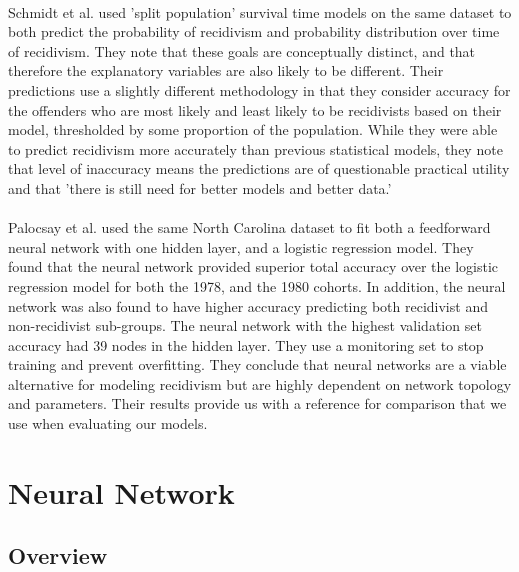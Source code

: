 \documentclass[a4paper]{article}
\theoremstyle{plain}
\begin{document}
\paragraph{}
Schmidt et al. \cite{schmidt1989predicting} used 'split population' survival time models on the same dataset to both predict the probability of recidivism and probability distribution over time of recidivism. They note that these goals are conceptually distinct, and that therefore the explanatory variables are also likely to be different. Their predictions use a slightly different methodology in that they consider accuracy for the offenders who are most likely and least likely to be recidivists based on their model, thresholded by some proportion of the population. While they were able to predict recidivism more accurately than previous statistical models, they note that level of inaccuracy means the predictions are of questionable practical utility and that 'there is still need for better models and better data.'

\paragraph{}
Palocsay et al. \cite{bib1} used the same North Carolina dataset to fit both a feedforward neural network with one hidden layer, and a logistic regression model. They found that the neural network provided superior total accuracy over the logistic regression model for both the 1978, and the 1980 cohorts. In addition, the neural network was also found to have higher accuracy predicting both recidivist and non-recidivist sub-groups. The neural network with the highest validation set accuracy had 39 nodes in the hidden layer. They use a monitoring set to stop training and prevent overfitting. They conclude that neural networks are a viable alternative for modeling recidivism but are highly dependent on network topology and parameters. Their results provide us with a reference for comparison that we use when evaluating our models.


\section{Neural Network}

\subsection{Overview}
\end{document}
